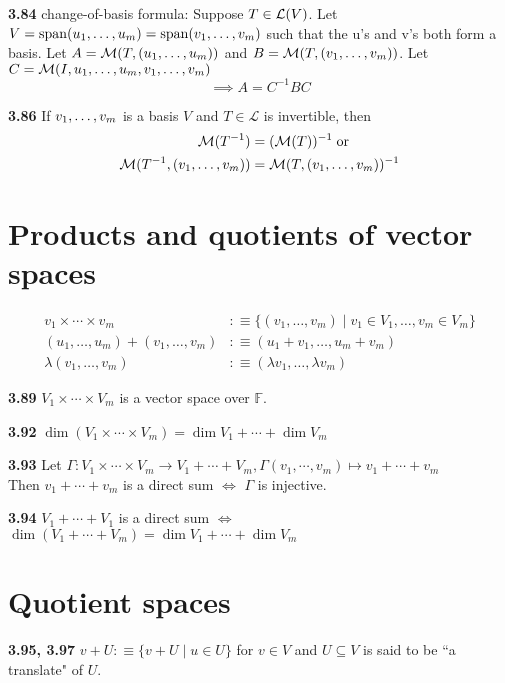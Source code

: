 \setcounter{thm}{83}
\textbf{3.84} change-of-basis formula: Suppose $T \in \mathcal{L}(V)$. Let 
$V = \operatorname{span} (u_1, \dots, u_m) = \operatorname{span} (v_1, \dots, v_m)$ such that the u's and v's both form a basis. Let $A=\mathcal{M}(T, (u_1, \dots, u_m))$ and $B=\mathcal{M}(T,(v_1, \dots, v_m))$. Let  
$C=\mathcal{M}(I, u_1, \dots, u_m, v_1, \dots, v_m)$ 
\begin {equation}
\implies A = C^{-1} B C
\end {equation} 

\setcounter{thm}{85}
\textbf{3.86} If $v_1, \dots, v_m$ is a basis $V$ and $T\in \mathcal{L}$ is invertible, then 
\begin{equation}
	\begin{aligned}
		\mathcal{M}(T^{-1}) & = (\mathcal{M}(T))^{-1} \; \text{or} \\
		\mathcal{M}(T^{-1}, (v_1, \dots, v_m)) & =\mathcal{M}(T, (v_1, \dots, v_m))^{-1}
	\end{aligned}
\end{equation}

\section{Products and quotients of vector spaces}
\begin{equation}
	\begin{aligned}
		v_1 \times \cdots \times v_m &:\equiv \{ (v_1, \dots, v_m) \mid v_1 \in V_1, \dots, v_m \in V_m\} \\
		(u_1, \dots, u_m) + (v_1, \dots, v_m) &:\equiv (u_1+v_1, \dots, u_m+v_m) \\
		\lambda (v_1, \dots, v_m) &:\equiv (\lambda v_1, \dots, \lambda v_m)			
	\end{aligned}
\end{equation}

\setcounter{thm}{88}
\textbf{3.89} $V_1 \times \cdots \times V_m$ is a vector space over $\mathbb{F}$.

\setcounter{thm}{91}
\textbf{3.92} $\dim (V_1 \times \cdots \times V_m) = \dim V_1 + \cdots + \dim V_m$

\textbf{3.93} Let $\Gamma: V_1 \times \cdots \times V_m \to V_1 + \cdots + V_m, \Gamma(v_1, \cdots, v_m) \mapsto v_1 + \cdots + v_m$ \\
Then $v_1 + \cdots + v_m$ is a direct sum $\iff$ $\Gamma$ is injective. 

\textbf{3.94} $V_1 + \cdots + V_1$ is a direct sum $\iff$
$\dim (V_1+\cdots+V_m) = \dim V_1 + \cdots + \dim V_m$

\section{Quotient spaces}
\textbf{3.95, 3.97} $v+U :\equiv \{v+U \mid u\in U\}$ for $v\in V$ and $U\subseteq V$ is said to be ``a translate" of $U$.

